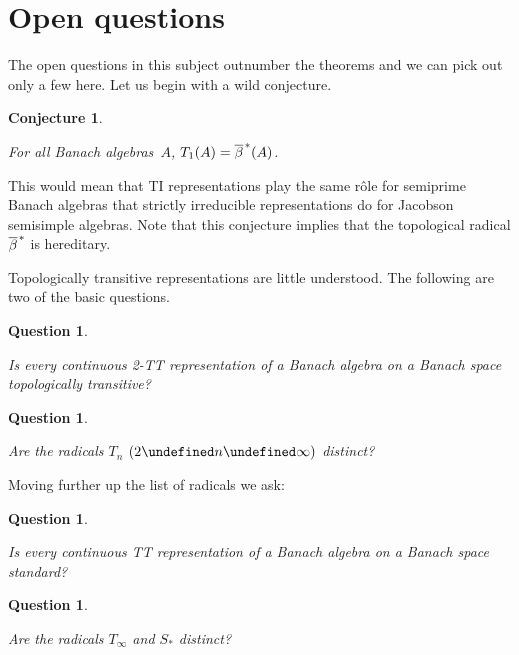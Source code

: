 \documentclass[11pt]{article}
\let\leq\undefined  \let\geq\undefined
\let\le\leq   \let\ge\geq
\newcommand{\closure}[1]{\overline{#1}}
\newtheorem{qu}[thm]{Question}
\newtheorem{conject}[thm]{Conjecture}
\newenvironment{Question}{\begin{qu}\begin{rm}}{\end{rm}\end{qu}}
\newenvironment{Conjecture}{\begin{conject}\begin{rm}}{\end{rm}\end{conject}}
\newcommand{\Detail}[1]{}
\newcommand{\barstar}[1]{{\closure{#1}\kern 1pt}^*}
\begin{document}
\Detail{The other relaxation we can make is to drop the requirement that our
representations be continuous.  Thus we may consider the intersection
$T_d(A)$ of all TI representations on a given algebra~$A$ on a Banach space.
This is an ideal containing $\beta(A)$, but it need not be closed; in Example
\ref{Ex3}, $\beta(A)=J(A)$ and $A/J(A)$ is isomorphic to the maximal ideal of
$\C[X]$ and therefore has a separating family of irreducible 1-dimensional
representations, so $T_d(A) = \beta(A)$ which is not closed.}
\section{Open questions}\label{S8}

The open questions in this subject outnumber the theorems and we can
pick out only a few here.   Let us begin with a wild conjecture.

\begin{Conjecture}\label{Conj1}
For all Banach algebras~$A$, $T_1(A) = \barstar \beta (A)$.
\end{Conjecture}

This would mean that TI representations play the same r\^ole for semiprime
Banach algebras that strictly irreducible representations do for Jacobson
semisimple algebras.   Note that this conjecture implies that the topological
radical $\barstar\beta$ is hereditary.

Topologically transitive representations are little understood.  The following
are two of the basic questions.

\begin{Question}\label{Q2}
Is every continuous 2-TT representation of a Banach algebra on a Banach space
topologically transitive?
\end{Question}

\begin{Question}\label{Q3}
Are the radicals $T_n$ $(2 \le n \le \infty)$ distinct?
\end{Question}

Moving further up the list of radicals we ask:

\begin{Question}\label{Q4}
Is every continuous TT representation of a Banach algebra
on a Banach space standard?
\end{Question}

\begin{Question}\label{Q5}
Are the radicals $T_\infty$ and $S_*$ distinct?
\end{Question}
\end{document}
